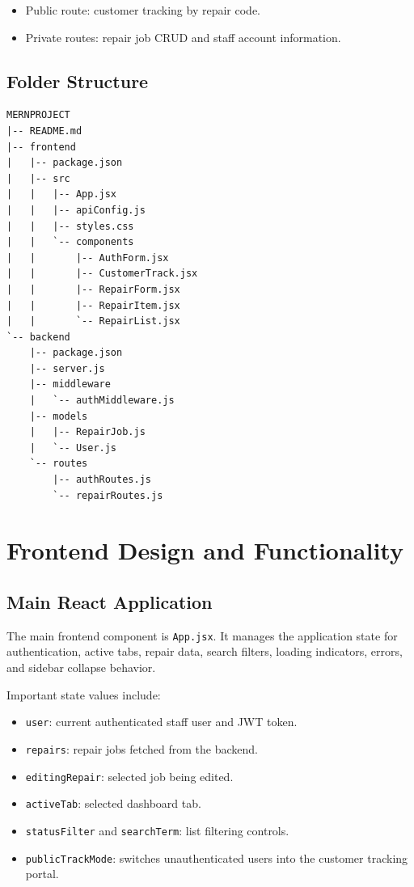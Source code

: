\documentclass[12pt,a4paper]{report}
\begin{document}
\begin{itemize}
  \item Public route: customer tracking by repair code.
  \item Private routes: repair job CRUD and staff account information.
\end{itemize}

\section{Folder Structure}

\begin{lstlisting}
MERNPROJECT
|-- README.md
|-- frontend
|   |-- package.json
|   |-- src
|   |   |-- App.jsx
|   |   |-- apiConfig.js
|   |   |-- styles.css
|   |   `-- components
|   |       |-- AuthForm.jsx
|   |       |-- CustomerTrack.jsx
|   |       |-- RepairForm.jsx
|   |       |-- RepairItem.jsx
|   |       `-- RepairList.jsx
`-- backend
    |-- package.json
    |-- server.js
    |-- middleware
    |   `-- authMiddleware.js
    |-- models
    |   |-- RepairJob.js
    |   `-- User.js
    `-- routes
        |-- authRoutes.js
        `-- repairRoutes.js
\end{lstlisting}

\chapter{Frontend Design and Functionality}

\section{Main React Application}

The main frontend component is \texttt{App.jsx}. It manages the application state for authentication, active tabs, repair data, search filters, loading indicators, errors, and sidebar collapse behavior.

Important state values include:

\begin{itemize}
  \item \texttt{user}: current authenticated staff user and JWT token.
  \item \texttt{repairs}: repair jobs fetched from the backend.
  \item \texttt{editingRepair}: selected job being edited.
  \item \texttt{activeTab}: selected dashboard tab.
  \item \texttt{statusFilter} and \texttt{searchTerm}: list filtering controls.
  \item \texttt{publicTrackMode}: switches unauthenticated users into the customer tracking portal.
\end{itemize}
\end{document}
